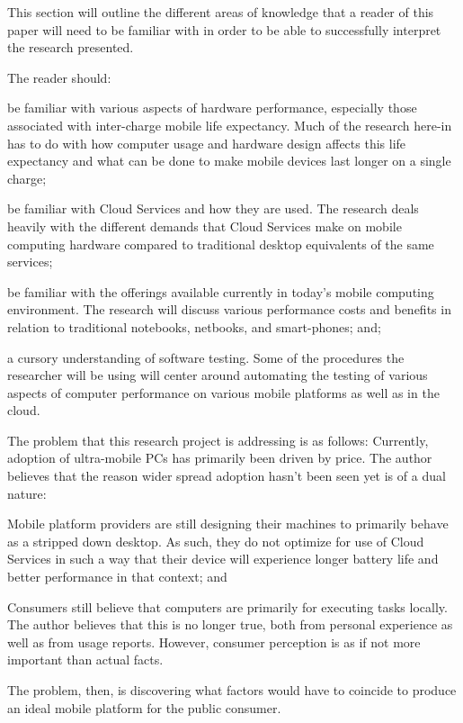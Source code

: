 This section will outline the different areas of knowledge that a reader of this
paper will need to be familiar with in order to be able to successfully
interpret the research presented.

The reader should:
\begin{inparaenum}[(1)]
\item be familiar with various aspects of hardware performance, especially those
  associated with inter-charge mobile life expectancy.  Much of the research
  here-in has to do with how computer usage and hardware design affects this
  life expectancy and what can be done to make mobile devices last longer on a
  single charge;
\item be familiar with Cloud Services and how they are used.  The research deals
  heavily with the different demands that Cloud Services make on mobile
  computing hardware compared to traditional desktop equivalents of the same
  services;
\item be familiar with the offerings available currently in today's mobile
  computing environment.  The research will discuss various performance costs
  and benefits in relation to traditional notebooks, netbooks, and smart-phones;
  and;
\item a cursory understanding of software testing.  Some of the procedures the
  researcher will be using will center around automating the testing of various
  aspects of computer performance on various mobile platforms as well as in the
  cloud.
\end{inparaenum}

The problem that this research project is addressing is as follows: Currently,
adoption of ultra-mobile PCs has primarily been driven by price.  The author
believes that the reason wider spread adoption hasn't been seen yet is of a dual
nature:
\begin{inparaenum}[(1)]
\item Mobile platform providers are still designing their machines to primarily
  behave as a stripped down desktop.  As such, they do not optimize for use of
  Cloud Services in such a way that their device will experience longer battery
  life and better performance in that context; and
\item Consumers still believe that computers are primarily for executing tasks
  locally.  The author believes that this is no longer true, both from personal
  experience as well as from usage reports.  However, consumer perception is as
  if not more important than actual facts.
\end{inparaenum}
The problem, then, is discovering what factors would have to coincide to produce
an ideal mobile platform for the public consumer.

